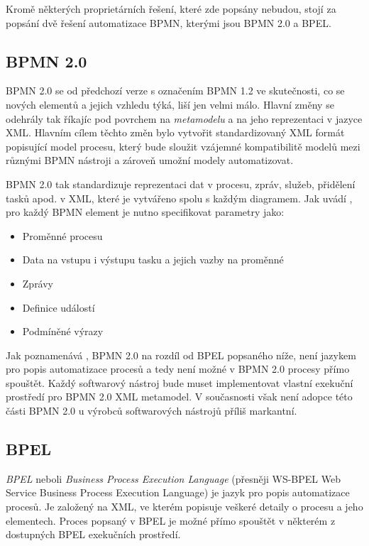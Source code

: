 Kromě některých proprietárních řešení, které zde popsány nebudou, stojí za popsání dvě řešení automatizace BPMN, kterými jsou BPMN 2.0 a BPEL.

\subsection{BPMN 2.0}
BPMN 2.0 se od předchozí verze s označením BPMN 1.2 ve skutečnosti, co se nových elementů a jejich vzhledu týká, liší jen velmi málo. Hlavní změny se odehrály tak říkajíc pod povrchem na \textit{metamodelu} a na jeho reprezentaci v jazyce XML. Hlavním cílem těchto změn bylo vytvořit standardizovaný XML formát popisující model procesu, který bude sloužit vzájemné kompatibilitě modelů mezi různými BPMN nástroji a zároveň umožní modely automatizovat. \cite{Silver2011} 

BPMN 2.0 tak standardizuje reprezentaci dat v procesu, zpráv, služeb, přidělení tasků apod. v XML, které je vytvářeno spolu s každým diagramem. Jak uvádí \cite{Silver2011}, pro každý BPMN element je nutno specifikovat parametry jako:

\begin{itemize}
\item Proměnné procesu
\item Data na vstupu i výstupu tasku a jejich vazby na proměnné
\item Zprávy
\item Definice událostí
\item Podmíněné výrazy
\end{itemize}

Jak poznamenává  \cite{Silver2011}, BPMN 2.0 na rozdíl od BPEL popsaného níže, není jazykem pro popis automatizace procesů a tedy není možné v BPMN 2.0 procesy přímo spouštět. Každý softwarový nástroj bude muset implementovat vlastní exekuční prostředí pro BPMN 2.0 XML metamodel. V současnosti však není adopce této části BPMN 2.0 u výrobců softwarových nástrojů příliš markantní. \cite{Silver20112}

\subsection{BPEL}
\textit{BPEL} neboli \textit{Business Process Execution Language} (přesněji WS-BPEL Web Service Business Process Execution Language) je jazyk pro popis automatizace procesů. Je založený na XML, ve kterém popisuje veškeré detaily o procesu a jeho elementech. Proces popsaný v BPEL je možné přímo spouštět v některém z dostupných BPEL exekučních prostředí.

